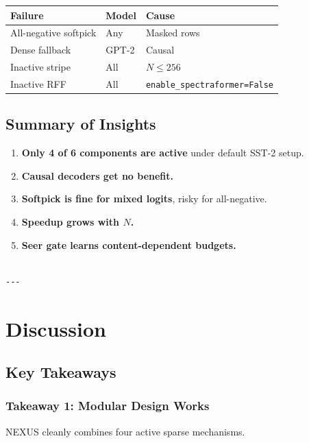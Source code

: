\begin{table}[H]
\centering
\small
\begin{tabular}{lll}
\toprule
\textbf{Failure} & \textbf{Model} & \textbf{Cause} \\
\midrule
All-negative softpick & Any & Masked rows \\
Dense fallback & GPT-2 & Causal \\
Inactive stripe & All & $N \leq 256$ \\
Inactive RFF & All & \texttt{enable\_spectraformer=False} \\
\bottomrule
\end{tabular}
\end{table}

\subsection{Summary of Insights}

\begin{enumerate}
\item \textbf{Only 4 of 6 components are active} under default SST-2 setup.
\item \textbf{Causal decoders get no benefit.}
\item \textbf{Softpick is fine for mixed logits}, risky for all-negative.
\item \textbf{Speedup grows with $N$.}
\item \textbf{Seer gate learns content-dependent budgets.}
\end{enumerate}
\begin{lstlisting}

---
\end{lstlisting}

\section{Discussion}

\subsection{Key Takeaways}

\subsubsection{Takeaway 1: Modular Design Works}

NEXUS cleanly combines four active sparse mechanisms.

